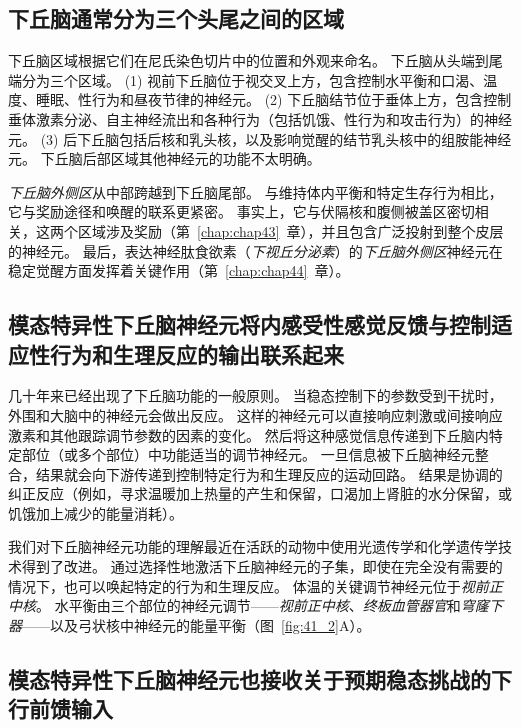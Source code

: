\subsection{下丘脑通常分为三个头尾之间的区域}

下丘脑区域根据它们在尼氏染色切片中的位置和外观来命名。
下丘脑从头端到尾端分为三个区域。
(1) 视前下丘脑位于视交叉上方，包含控制水平衡和口渴、温度、睡眠、性行为和昼夜节律的神经元。
(2) 下丘脑结节位于垂体上方，包含控制垂体激素分泌、自主神经流出和各种行为（包括饥饿、性行为和攻击行为）的神经元。
(3) 后下丘脑包括后核和乳头核，以及影响觉醒的结节乳头核中的组胺能神经元。
下丘脑后部区域其他神经元的功能不太明确。


\textit{下丘脑外侧区}从中部跨越到下丘脑尾部。
与维持体内平衡和特定生存行为相比，它与奖励途径和唤醒的联系更紧密。
事实上，它与伏隔核和腹侧被盖区密切相关，这两个区域涉及奖励（第~\ref{chap:chap43}~章），并且包含广泛投射到整个皮层的神经元。
最后，表达神经肽食欲素（\textit{下视丘分泌素}）的\textit{下丘脑外侧区}神经元在稳定觉醒方面发挥着关键作用（第~\ref{chap:chap44}~章）。



\subsection{模态特异性下丘脑神经元将内感受性感觉反馈与控制适应性行为和生理反应的输出联系起来}

几十年来已经出现了下丘脑功能的一般原则。
当稳态控制下的参数受到干扰时，外围和大脑中的神经元会做出反应。
这样的神经元可以直接响应刺激或间接响应激素和其他跟踪调节参数的因素的变化。
然后将这种感觉信息传递到下丘脑内特定部位（或多个部位）中功能适当的调节神经元。
一旦信息被下丘脑神经元整合，结果就会向下游传递到控制特定行为和生理反应的运动回路。
结果是协调的纠正反应（例如，寻求温暖加上热量的产生和保留，口渴加上肾脏的水分保留，或饥饿加上减少的能量消耗）。


我们对下丘脑神经元功能的理解最近在活跃的动物中使用光遗传学和化学遗传学技术得到了改进。
通过选择性地激活下丘脑神经元的子集，即使在完全没有需要的情况下，也可以唤起特定的行为和生理反应。
体温的关键调节神经元位于\textit{视前正中核}。
水平衡由三个部位的神经元调节——\textit{视前正中核}、\textit{终板血管器官}和\textit{穹窿下器}——以及弓状核中神经元的能量平衡（图~\ref{fig:41_2}A）。



\subsection{模态特异性下丘脑神经元也接收关于预期稳态挑战的下行前馈输入}

